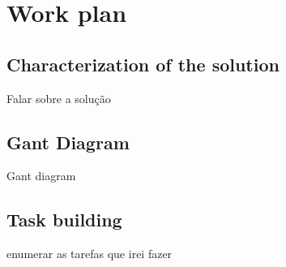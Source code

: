 
%

\chapter{Work plan}
\label{cha:work_plan}


\section{Characterization of the solution}
\label{sec:characterization_of_the_solution}

Falar sobre a solução
 
\section{Gant Diagram }
\label{sec:gant_diagram}

Gant diagram

\section{Task building}
\label{sec:task_building}

enumerar as tarefas que irei fazer
